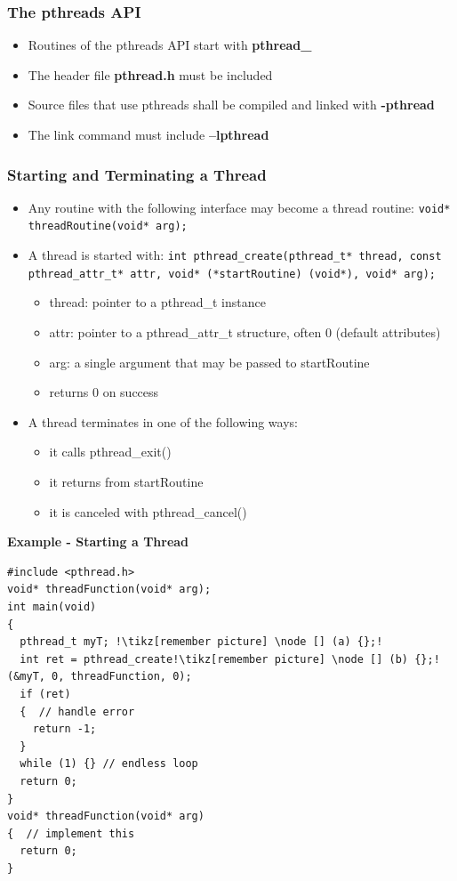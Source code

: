 \subsubsection{The pthreads API}
\begin{itemize}
  \item Routines of the pthreads API start with \textbf{pthread\_}
  \item The header file \textbf{pthread.h} must be included
  \item Source files that use pthreads shall be compiled and linked with \textbf{-pthread}
  \item The link command must include \textbf{–lpthread}
\end{itemize}

\subsubsection{Starting and Terminating a Thread}
\begin{itemize}
  \item Any routine with the following interface may become a thread routine:\newline
  \lstinline{void* threadRoutine(void* arg);}
  \item A thread is started with:\newline
  \lstinline{int pthread_create(pthread_t* thread, const pthread_attr_t* attr, void* (*startRoutine) (void*), void* arg);}
  \begin{itemize}
  \item thread: pointer to a pthread\_t instance
  \item attr: pointer to a pthread\_attr\_t structure, often 0 (default attributes)
  \item arg: a single argument that may be passed to startRoutine
  \item returns 0 on success
  \end{itemize}
\item A thread terminates in one of the following ways:
  \begin{itemize}
  \item it calls pthread\_exit()
  \item it returns from startRoutine
  \item it is canceled with pthread\_cancel()
  \end{itemize}
\end{itemize}
\textbf{Example - Starting a Thread}
\begin{lstlisting}[style=C, escapechar=!]
#include <pthread.h>
void* threadFunction(void* arg);
int main(void)
{
  pthread_t myT; !\tikz[remember picture] \node [] (a) {};!
  int ret = pthread_create!\tikz[remember picture] \node [] (b) {};!(&myT, 0, threadFunction, 0);
  if (ret)
  {  // handle error
    return -1;
  }
  while (1) {} // endless loop
  return 0;
}
void* threadFunction(void* arg)
{  // implement this
  return 0;
}
\end{lstlisting}
